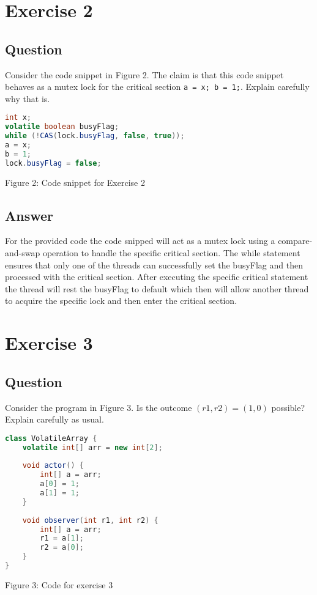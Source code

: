 \documentclass{article}
\begin{document}
\section*{Exercise 2}
\subsection*{Question}
Consider the code snippet in Figure 2. The claim is that this code snippet behaves as a mutex lock for the critical section \texttt{a = x; b = 1;}. Explain carefully why that is.

\begin{lstlisting}[language=Java]
int x;
volatile boolean busyFlag;
while (!CAS(lock.busyFlag, false, true));
a = x;
b = 1;
lock.busyFlag = false;
\end{lstlisting}
Figure 2: Code snippet for Exercise 2

\subsection*{Answer}
For the provided code the code snipped will act as a mutex lock using a compare-and-swap operation to handle the specific critical section. The while statement ensures that only one of the threads can successfully set the busyFlag and then processed with the critical section. After executing the specific critical statement the thread will rest the busyFlag to default which then will allow another thread to acquire the specific lock and then enter the critical section.






\section*{Exercise 3}
\subsection*{Question}
Consider the program in Figure 3. Is the outcome $(r1, r2) = (1, 0)$ possible? Explain carefully as usual.

\begin{lstlisting}[language=Java]
class VolatileArray {
    volatile int[] arr = new int[2];
    
    void actor() {
        int[] a = arr;
        a[0] = 1;
        a[1] = 1;
    }
    
    void observer(int r1, int r2) {
        int[] a = arr;
        r1 = a[1];
        r2 = a[0];
    }
}
\end{lstlisting}
Figure 3: Code for exercise 3
\end{document}
